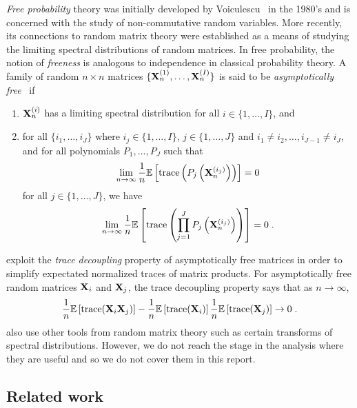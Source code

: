 \textit{Free probability} theory was initially developed by Voiculescu~\citep{Voiculescu:1992} in the 1980's and is concerned with the study of non-commutative random variables. More recently, its connections to random matrix theory were established as a means of studying the limiting spectral distributions of random matrices. In free probability, the notion of \textit{freeness} is analogous to independence in classical probability theory. A family of random $n\times n$ matrices $\{\mathbf{X}_n^{(1)},\ldots,\mathbf{X}_n^{(I)}\}$ is said to be \textit{asymptotically free}~\citep{Couillet:2011_free} if
\begin{enumerate}
\item
$\mathbf{X}_n^{(i)}$ has a limiting spectral distribution for all $i\in\{1,\ldots,I\}$, and
\item
for all $\{i_1,\ldots,i_J\}$ where $i_j\in\{1,\ldots,I\}$, $j\in\{1,\ldots,J\}$ and $i_1\neq i_2,\ldots,i_{J-1}\neq i_J$, and for all polynomials $P_1,\ldots,P_J$ such that
\[
\lim_{n\rightarrow\infty} \frac{1}{n}\mathbb{E}\left[\mathrm{trace}\left(P_j\left(\mathbf{X}_n^{(i_j)}\right)\right)\right] = 0
\]
for all $j\in\{1,\ldots,J\}$, we have
\[
\lim_{n\rightarrow\infty} \frac{1}{n}\mathbb{E}\left[\mathrm{trace}\left(\prod_{j=1}^JP_j\left(\mathbf{X}_n^{(i_j)}\right)\right)\right] = 0 \;.
\]
\end{enumerate}
\citet{Lacotte:2020} exploit the \textit{trace decoupling} property of asymptotically free matrices in order to simplify expectated normalized traces of matrix products. For asymptotically free random matrices $\mathbf{X}_i$ and $\mathbf{X}_j$, the trace decoupling property says that as $n\rightarrow\infty$,
\[
\frac{1}{n}\mathbb{E}\left[\mathrm{trace}(\mathbf{X}_i\mathbf{X}_j)\right] - \frac{1}{n}\mathbb{E}\left[\mathrm{trace}(\mathbf{X}_i)\right]\frac{1}{n}\mathbb{E}\left[\mathrm{trace}(\mathbf{X}_j)\right] \rightarrow 0 \;.
\]
\citet{Lacotte:2020} also use other tools from random matrix theory such as certain transforms of spectral distributions. However, we do not reach the stage in the analysis where they are useful and so we do not cover them in this report.


\subsection{Related work} \label{sec:literature}

